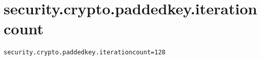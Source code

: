 \section{security.crypto.paddedkey.iterationcount}
\label{configuration:SecurityCryptoPaddedkeyIterationcount}
\ClearAPI
\TODO
{}
\begin{lstlisting}[style=Props,caption={Usage example for \textit{security.crypto.paddedkey.iterationcount}}]
security.crypto.paddedkey.iterationcount=128
\end{lstlisting}